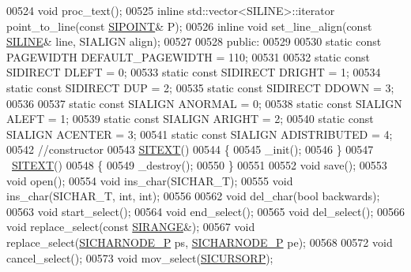 \begin{DoxyCode}
00524     \textcolor{keywordtype}{void} proc\_text();   
00525     \textcolor{keyword}{inline} std::vector<SILINE>::iterator point\_to\_line(\textcolor{keyword}{const} \hyperlink{struct_s_i_p_o_i_n_t}{SIPOINT}& P);    
00526     \textcolor{keyword}{inline} \textcolor{keywordtype}{void} set\_line\_align(\textcolor{keyword}{const} \hyperlink{struct_s_i_r_a_n_g_e}{SILINE}& line, SIALIGN align);    
00527 
00528 \textcolor{keyword}{public}:
00529 
00530     \textcolor{keyword}{static} \textcolor{keyword}{const} PAGEWIDTH DEFAULT\_PAGEWIDTH = 110;
00531 
00532     \textcolor{keyword}{static} \textcolor{keyword}{const} SIDIRECT DLEFT = 0;
00533     \textcolor{keyword}{static} \textcolor{keyword}{const} SIDIRECT DRIGHT = 1;
00534     \textcolor{keyword}{static} \textcolor{keyword}{const} SIDIRECT DUP = 2;
00535     \textcolor{keyword}{static} \textcolor{keyword}{const} SIDIRECT DDOWN = 3;
00536 
00537     \textcolor{keyword}{static} \textcolor{keyword}{const} SIALIGN ANORMAL = 0;
00538     \textcolor{keyword}{static} \textcolor{keyword}{const} SIALIGN ALEFT = 1;
00539     \textcolor{keyword}{static} \textcolor{keyword}{const} SIALIGN ARIGHT = 2;
00540     \textcolor{keyword}{static} \textcolor{keyword}{const} SIALIGN ACENTER = 3;
00541     \textcolor{keyword}{static} \textcolor{keyword}{const} SIALIGN ADISTRIBUTED = 4;
00542     \textcolor{comment}{//constructor}
00543     \hyperlink{class_s_i_t_e_x_t}{SITEXT}()  
00544     \{
00545         \_init();
00546     \}
00547     ~\hyperlink{class_s_i_t_e_x_t}{SITEXT}() 
00548     \{
00549         \_destroy();
00550     \}
00551     
00552     \textcolor{keywordtype}{void} save();    
00553     \textcolor{keywordtype}{void} open();    
00554     \textcolor{keywordtype}{void} ins\_char(SICHAR\_T);    
00555     \textcolor{keywordtype}{void} ins\_char(SICHAR\_T, \textcolor{keywordtype}{int}, \textcolor{keywordtype}{int});  
00556 
00562     \textcolor{keywordtype}{void} del\_char(\textcolor{keywordtype}{bool} backwards);
00563     \textcolor{keywordtype}{void} start\_select();    
00564     \textcolor{keywordtype}{void} end\_select();  
00565     \textcolor{keywordtype}{void} del\_select();  
00566     \textcolor{keywordtype}{void} replace\_select(\textcolor{keyword}{const} \hyperlink{struct_s_i_r_a_n_g_e}{SIRANGE}&); 
00567     \textcolor{keywordtype}{void} replace\_select(\hyperlink{class_s_i_c_h_a_r_n_o_d_e}{SICHARNODE\_P} ps, \hyperlink{class_s_i_c_h_a_r_n_o_d_e}{SICHARNODE\_P} pe);  
00568 
00572     \textcolor{keywordtype}{void} cancel\_select();
00573     \textcolor{keywordtype}{void} mov\_select(\hyperlink{class_s_i_c_h_a_r_n_o_d_e}{SICURSORP});    

\end{DoxyCode}
